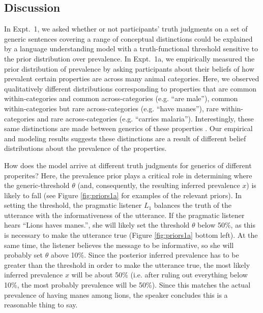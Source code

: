 \documentclass[10pt,letterpaper]{article}
\begin{document}
\subsection{Discussion}

In Expt.~1, we asked whether or not participants' truth judgments on a set of generic sentences covering a range of conceptual distinctions could be explained by a language understanding model with a truth-functional threshold sensitive to the prior distribution over prevalence. 
In Expt.~1a, we empirically measured the prior distribution of prevalence by asking participants about their beliefs of how prevalent certain properties are across many animal categories. 
Here, we observed qualitatively different distributions corresponding to properties that are common within-categories and common across-categories (e.g. ``are male''), common within-categories but rare across-categories (e.g. ``have manes''), rare within-categories and rare across-categories (e.g. ``carries malaria''). Interestingly, these same distinctions are made between generics of these properties \cite{Prasada2013}. 
Our empirical and modeling results suggests these distinctions are a result of different belief distributions about the prevalence of the properties.

How does the model arrive at different truth judgments for generics of different properites?
Here, the prevalence prior plays a critical role in determining where the generic-threshold $\theta$ (and, consequently, the resulting inferred prevalence $x$) is likely to fall (see Figure \ref{fig:priors1a} for examples of the relevant priors). 
In setting the threshold, the pragmatic listener $L_{1}$ balances the truth of the utterance with the informativeness of the utterance. 
If the pragmatic listener hears ``Lions haves manes.'', she will likely set the threshold $\theta$ below 50\%, as this is necessary to make the utterance true (Figure \ref{fig:priors1a} bottom left). 
At the same time, the listener believes the message to be informative, so she will probably set $\theta$ above 10\%. 
Since the posterior inferred prevalence has to be greater than the threshold in order to make the utterance true, the most likely inferred prevalence $x$ will be about 50\% (i.e. after ruling out everything below 10\%, the most probably prevalence will be 50\%). 
Since this matches the actual prevalence of having manes among lions, the speaker concludes this is a reasonable thing to say.
\end{document}
